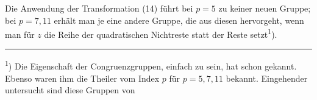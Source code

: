 Die Anwendung der Transformation (14) führt bei $p = 5$ zu keiner neuen Gruppe; bei $p = 7, 11$ erhält man je eine andere Gruppe, die aus diesen hervorgeht, wenn man für $z$ die Reihe der quadratischen Nichtreste statt der Reste setzt\textsuperscript{1}).

\bigskip
\hrule
\bigskip

\textsuperscript{1}) Die Eigenschaft der Congruenzgruppen, einfach zu sein, hat schon  gekannt. Ebenso waren ihm die Theiler vom Index $p$ für $p = 5, 7, 11$ bekannt. Eingehender untersucht sind diese Gruppen von
